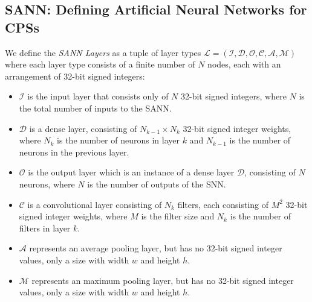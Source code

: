 

\subsection{\ac{SANN}: Defining Artificial Neural Networks for \acp{CPS}}
\begin{definition}
	\label{def:layer}We define the \emph{\ac{SANN} Layers} as a tuple of layer types $\mathcal{L} = (\mathcal{I}, \mathcal{D}, \mathcal{O}, \mathcal{C}, \mathcal{A}, \mathcal{M})$ where each layer type consists of a finite number of $N$ nodes, each with an arrangement of 32-bit signed integers:
	\begin{itemize}
		\item $\mathcal{I}$ is the input layer that consists only of $N$ 32-bit signed integers, where $N$ is the total number of inputs to the \ac{SANN}.
		\item $\mathcal{D}$ is a dense layer, consisting of $N_{k-1} \times N_k$ 32-bit signed integer weights, where $N_k$ is the number of neurons in layer $k$ and $N_{k-1}$ is the number of neurons in the previous layer.
		\item $\mathcal{O}$ is the output layer which is an instance of a dense layer $\mathcal{D}$, consisting of $N$ neurons, where $N$ is the number of outputs of the \ac{SNN}.
		\item $\mathcal{C}$ is a convolutional layer consisting of $N_k$ filters, each consisting of $M^2$ 32-bit signed integer weights, where $M$ is the filter size and $N_k$ is the number of filters in layer $k$.
		\item $\mathcal{A}$ represents an average pooling layer, but has no 32-bit signed integer values, only a size with width $w$ and height $h$.
		\item $\mathcal{M}$ represents an maximum pooling layer, but has no 32-bit signed integer values, only a size with width $w$ and height $h$.
	\end{itemize}
\end{definition}

